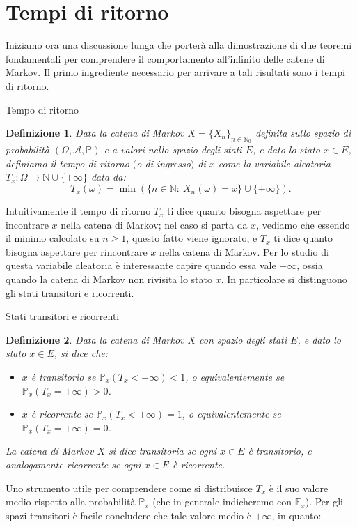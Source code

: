 \documentclass[11pt]{book}
\theoremstyle{Definizione}
\newtheorem*{mydef}{Definizione}
\theoremstyle{TeoremaProposizioneLemmaCorollario}
\theoremstyle{OsservazioneNota}
\newcommand{\N}{\mathbb{N}}
\renewcommand{\P}{\mathbb{P}}
\newcommand{\E}{\mathbb{E}}
\begin{document}
\section{Tempi di ritorno}
Iniziamo ora una discussione lunga che porterà alla dimostrazione di due teoremi fondamentali per comprendere il comportamento all'infinito delle catene di Markov. Il primo ingrediente necessario per arrivare a tali risultati sono i tempi di ritorno.
\begin{boxdef}{Tempo di ritorno}
\begin{mydef}
Data la catena di Markov $X = \{X_n\}_{n\in \N_0}$ definita sullo spazio di probabilità $(\Omega,\mathcal{A},\P)$ e a valori nello spazio degli stati $E$, e dato lo stato $x\in E$, definiamo il tempo di ritorno $($o di ingresso$)$ di $x$ come la variabile aleatoria $T_x:\Omega \longrightarrow \N \cup \{+\infty\}$ data da:
$$
T_x(\omega) = \min\left(\{n\in \N:\ X_n(\omega) = x\}\cup \{+\infty\}\right).
$$ 
\end{mydef}
\end{boxdef}
\noindent
Intuitivamente il tempo di ritorno $T_x$ ti dice quanto bisogna aspettare per incontrare $x$ nella catena di Markov; nel caso si parta da $x$, vediamo che essendo il minimo calcolato su $n \geq 1$, questo fatto viene ignorato, e $T_x$ ti dice quanto bisogna aspettare per rincontrare $x$ nella catena di Markov. Per lo studio di questa variabile aleatoria è interessante capire quando essa vale $+\infty$, ossia quando la catena di Markov non rivisita lo stato $x$. In particolare si distinguono gli stati transitori e ricorrenti.
\begin{boxdef}{Stati transitori e ricorrenti}
\begin{mydef}
Data la catena di Markov $X$ con spazio degli stati $E$, e dato lo stato $x\in E$, si dice che:
\begin{itemize}
\item $x$ è transitorio se $\P_x(T_x < +\infty) < 1$, o equivalentemente se $\P_x(T_x = +\infty) > 0$.
\item $x$ è ricorrente se $\P_x(T_x<+\infty) = 1$, o equivalentemente se $\P_x(T_x = +\infty) = 0$.
\end{itemize}
La catena di Markov $X$ si dice transitoria se ogni $x\in E$ è transitorio, e analogamente ricorrente se ogni $x\in E$ è ricorrente.
\end{mydef}
\end{boxdef}
\noindent
Uno strumento utile per comprendere come si distribuisce $T_x$ è il suo valore medio rispetto alla probabilità $\P_x$ (che in generale indicheremo con $\E_x$). Per gli spazi transitori è facile concludere che tale valore medio è $+\infty$, in quanto:
\end{document}
